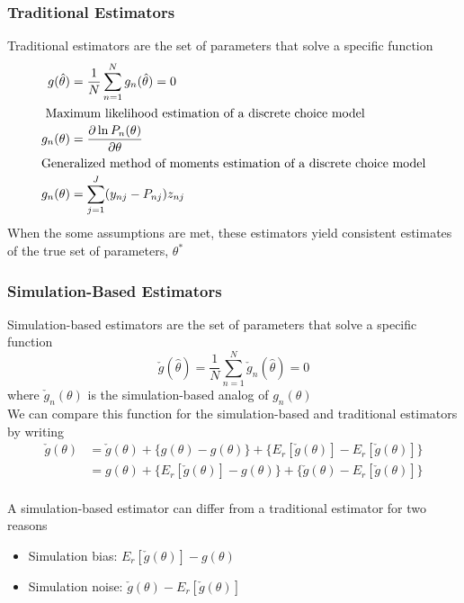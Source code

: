 \documentclass{beamer}
\begin{document}
\begin{frame}\frametitle{Traditional Estimators}
    Traditional estimators are the set of parameters that solve a specific function
    \begin{align*}
        g(\hat{\theta}) &= \frac{1}{N} \sum_{n = 1}^N g_n(\hat{\theta}) = 0 \\
        \intertext{ Maximum likelihood estimation of a discrete choice model}
        g_n(\theta) &= \frac{\partial \ln P_n(\theta)}{\partial \theta} \\
        \intertext{Generalized method of moments estimation of a discrete choice model}
        g_n(\theta) &= \sum_{j = 1}^J (y_{nj} - P_{nj}) z_{nj}
    \end{align*}
    When the some assumptions are met, these estimators yield consistent estimates of the true set of parameters, $\theta^*$
\end{frame}

\begin{frame}\frametitle{Simulation-Based Estimators}
     Simulation-based estimators are the set of parameters that solve a specific function
     $$\check{g}(\hat{\theta}) = \frac{1}{N} \sum_{n = 1}^N \check{g}_n(\hat{\theta}) = 0$$
     where $\check{g}_n(\theta)$ is the simulation-based analog of $g_n(\theta)$ \\
     \vspace{2ex}
     We can compare this function for the simulation-based and traditional estimators by writing
     \begin{align*}
        \check{g}(\theta) &= \check{g}(\theta) + \{ g(\theta) - g(\theta) \} + \{ E_r[\check{g}(\theta)] - E_r[\check{g}(\theta)] \} \\
        &= g(\theta) + \{ E_r[\check{g}(\theta)] - g(\theta) \} + \{ \check{g}(\theta) - E_r[\check{g}(\theta)] \}
     \end{align*} \\
     \vspace{2ex}
     A simulation-based estimator can differ from a traditional estimator for two reasons
     \begin{itemize}
         \item Simulation bias: $E_r[\check{g}(\theta)] - g(\theta)$
         \item Simulation noise: $\check{g}(\theta) - E_r[\check{g}(\theta)]$
     \end{itemize}
\end{frame}
\end{document}
